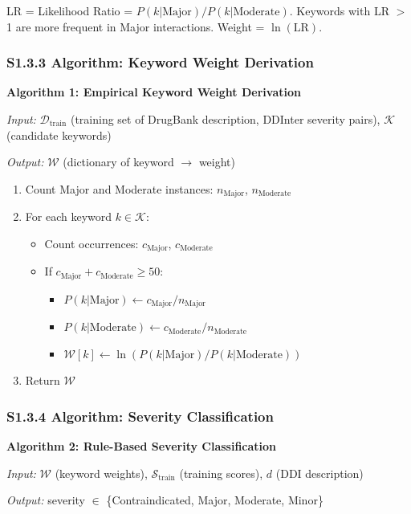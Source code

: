 \documentclass[11pt,a4paper]{article}
\begin{document}
LR = Likelihood Ratio = $P(k|\text{Major}) / P(k|\text{Moderate})$. Keywords with LR $>$ 1 are more frequent in Major interactions. Weight = $\ln(\text{LR})$.

\subsubsection{S1.3.3 Algorithm: Keyword Weight Derivation}

\textbf{Algorithm 1: Empirical Keyword Weight Derivation}

\textit{Input:} $\mathcal{D}_{\text{train}}$ (training set of DrugBank description, DDInter severity pairs), $\mathcal{K}$ (candidate keywords)

\textit{Output:} $\mathcal{W}$ (dictionary of keyword $\rightarrow$ weight)

\begin{enumerate}
\item Count Major and Moderate instances: $n_{\text{Major}}$, $n_{\text{Moderate}}$
\item For each keyword $k \in \mathcal{K}$:
\begin{itemize}
\item Count occurrences: $c_{\text{Major}}$, $c_{\text{Moderate}}$
\item If $c_{\text{Major}} + c_{\text{Moderate}} \geq 50$:
\begin{itemize}
\item $P(k|\text{Major}) \gets c_{\text{Major}} / n_{\text{Major}}$
\item $P(k|\text{Moderate}) \gets c_{\text{Moderate}} / n_{\text{Moderate}}$
\item $\mathcal{W}[k] \gets \ln(P(k|\text{Major}) / P(k|\text{Moderate}))$
\end{itemize}
\end{itemize}
\item Return $\mathcal{W}$
\end{enumerate}

\subsubsection{S1.3.4 Algorithm: Severity Classification}

\textbf{Algorithm 2: Rule-Based Severity Classification}

\textit{Input:} $\mathcal{W}$ (keyword weights), $\mathcal{S}_{\text{train}}$ (training scores), $d$ (DDI description)

\textit{Output:} severity $\in$ \{Contraindicated, Major, Moderate, Minor\}
\end{document}
